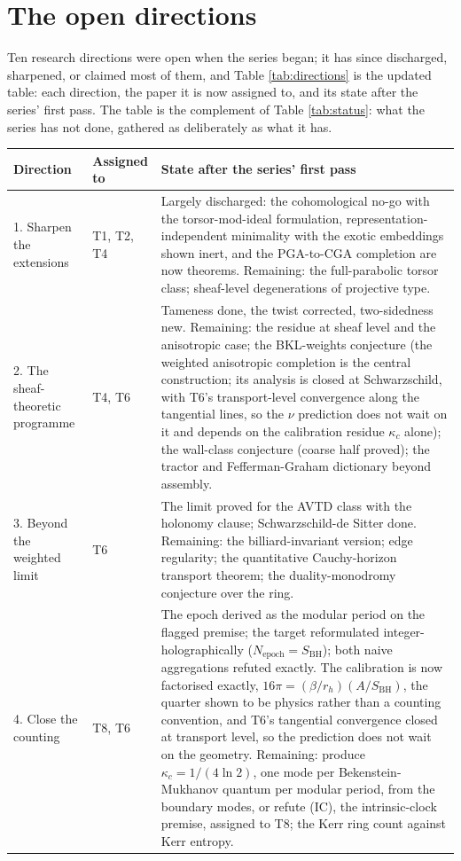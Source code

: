 \documentclass[11pt]{article}
\theoremstyle{definition}
\begin{document}
\section{The open directions}\label{sec:directions}

Ten research directions were open when the series began; it has since discharged, sharpened, or claimed most of them, and Table \ref{tab:directions} is the updated table: each direction, the paper it is now assigned to, and its state after the series' first pass. The table is the complement of Table \ref{tab:status}: what the series has not done, gathered as deliberately as what it has.

\begingroup\small
\begin{longtable}{p{} p{} p{}}
\toprule
\textbf{Direction} & \textbf{Assigned to} & \textbf{State after the series' first pass} \\
\midrule
\endhead
1. Sharpen the extensions & T1, T2, T4 & Largely discharged: the cohomological no-go with the torsor-mod-ideal formulation, representation-independent minimality with the exotic embeddings shown inert, and the PGA-to-CGA completion are now theorems. Remaining: the full-parabolic torsor class; sheaf-level degenerations of projective type. \\
2. The sheaf-theoretic programme & T4, T6 & Tameness done, the twist corrected, two-sidedness new. Remaining: the residue at sheaf level and the anisotropic case; the BKL-weights conjecture (the weighted anisotropic completion is the central construction; its analysis is closed at Schwarzschild, with T6's transport-level convergence along the tangential lines, so the $\nu$ prediction does not wait on it and depends on the calibration residue $\kappa_{c}$ alone); the wall-class conjecture (coarse half proved); the tractor and Fefferman-Graham dictionary beyond assembly. \\
3. Beyond the weighted limit & T6 & The limit proved for the AVTD class with the holonomy clause; Schwarzschild-de Sitter done. Remaining: the billiard-invariant version; edge regularity; the quantitative Cauchy-horizon transport theorem; the duality-monodromy conjecture over the ring. \\
4. Close the counting & T8, T6 & The epoch derived as the modular period on the flagged premise; the target reformulated integer-holographically ($N_{\mathrm{epoch}} = S_{\mathrm{BH}}$); both naive aggregations refuted exactly. The calibration is now factorised exactly, $16\pi = (\beta/r_{h})(A/S_{\mathrm{BH}})$, the quarter shown to be physics rather than a counting convention, and T6's tangential convergence closed at transport level, so the prediction does not wait on the geometry. Remaining: produce $\kappa_{c} = 1/(4\ln 2)$, one mode per Bekenstein-Mukhanov quantum per modular period, from the boundary modes, or refute (IC), the intrinsic-clock premise, assigned to T8; the Kerr ring count against Kerr entropy. \\

\end{longtable}
\end{document}
